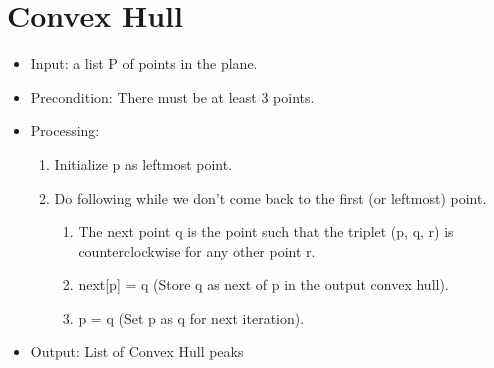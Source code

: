 \documentclass{scrreprt}
\begin{document}
\section{Convex Hull}
\begin{itemize}
    \item Input: a list P of points in the plane.
    \item Precondition: There must be at least 3 points.
    \item Processing:
    \begin{enumerate}
        \item Initialize p as leftmost point.
        \item Do following while we don’t come back to the first (or leftmost) point.
        \begin{enumerate}
            \item The next point q is the point such that the triplet (p, q, r) is counterclockwise for any other point r.
            \item next[p] = q (Store q as next of p in the output convex hull).
            \item p = q (Set p as q for next iteration).
        \end{enumerate}
    \end{enumerate}
    \item Output: List of Convex Hull peaks
\end{itemize}
\end{document}
